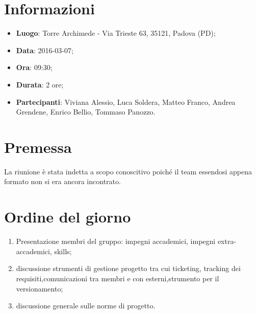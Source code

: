 \documentclass[a4paper,titlepage]{article}
\begin{document}
\maketitle

\newpage
\tableofcontents

\newpage
\section{Informazioni}
\label{sec:Informazioni}

\begin{itemize}
 \item \textbf{Luogo}: Torre Archimede - Via Trieste 63, 35121, Padova (PD);
 \item \textbf{Data}: 2016-03-07;
 \item \textbf{Ora}: 09:30;
 \item \textbf{Durata}: 2 ore;
 \item \textbf{Partecipanti}: Viviana Alessio, Luca Soldera, Matteo Franco, Andrea Grendene, Enrico Bellio, Tommaso Panozzo.
\end{itemize}

\newpage
\section{Premessa}

La riunione è stata indetta a scopo conoscitivo poiché il team essendosi appena formato non si era ancora incontrato.

\section{Ordine del giorno}
\label{sec:OrdineDelGiorno}
\begin{enumerate}
  \item Presentazione membri del gruppo: impegni accademici, impegni extra-accademici, skills;
  \item discussione strumenti di gestione progetto tra cui ticketing, tracking dei requisiti,comunicazioni tra membri e con esterni,strumento per il versionamento; %
  \item discussione generale sulle norme di progetto.
\end{enumerate}
\end{document}
